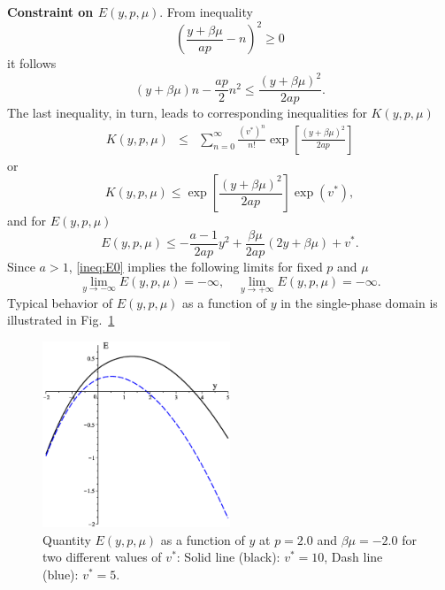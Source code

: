 \documentclass[12pt]{article}
\numberwithin{equation}{section}
\begin{document}
	\textbf{Constraint on $E(y,p,\mu)$}. From inequality
	\begin{equation}
		\left(\frac{y+\beta\mu}{ap} - n\right)^2 \geq 0
	\end{equation}
	it follows
	\begin{equation}
		(y+\beta\mu)n - \frac{ap}{2}n^2 \leq \frac{(y+\beta\mu)^2}{2ap}.
	\end{equation}
	The last inequality, in turn, leads to corresponding inequalities for $K(y,p,\mu)$
	\begin{eqnarray}
		K(y,p,\mu) & \leq & \sum_{n=0}^{\infty}\frac{(v^*)^n}{n!} \exp[\frac{(y+\beta\mu)^2}{2ap}]
	\end{eqnarray}
	or
	\begin{equation}
		K(y,p,\mu) \leq \exp[\frac{(y+\beta\mu)^2}{2ap}] \exp(v^*),
	\end{equation}
	and for $E(y,p,\mu)$
	\begin{equation}
		\label{ineq:E0}
		E(y,p,\mu) \leq -\frac{a-1}{2ap}y^2 + \frac{\beta\mu}{2ap}(2y+\beta\mu) + v^*.
	\end{equation}
	Since $a>1$, \eqref{ineq:E0} implies the following limits for fixed $p$ and $\mu$
	\begin{equation}
		\lim_{y \to -\infty} E(y,p,\mu) = -\infty, \quad \lim\limits_{y \to +\infty} E(y,p,\mu) = -\infty.
	\end{equation}
	Typical behavior of $E(y,p,\mu)$ as a function of $y$ in the single-phase domain is illustrated in Fig.~\ref{fig:E0_vs_y}
	\begin{figure}[htbp]
		\includegraphics[width=0.5\textwidth,angle=0]{E0_vs_y}
		\centering
		\captionsetup{width=0.6\textwidth}
		\caption{Quantity $E(y,p,\mu)$ as a function of $y$ at $p=2.0$ and $\beta\mu=-2.0$ for two different values of $v^*$: Solid line (black): $v^* = 10$, Dash line (blue): $v^* = 5$.}
		\label{fig:E0_vs_y}
	\end{figure}
	
\end{document}
